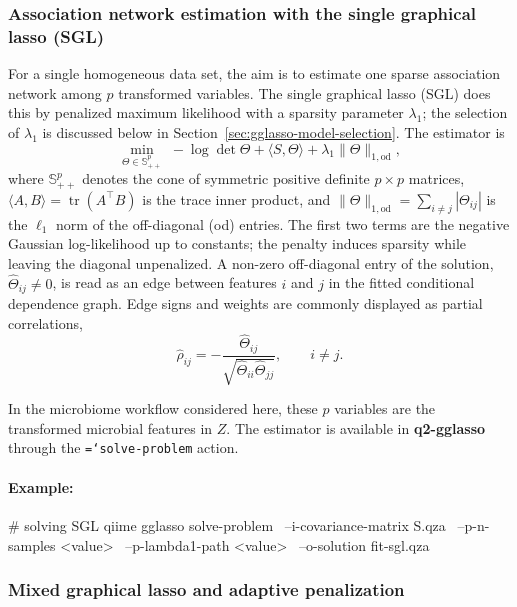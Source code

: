 \documentclass[11pt,a4paper]{article}
\newcommand{\code}[1]{\allowbreak\texttt{\hyphenchar\font=`\-\relax #1}}
\newcommand{\pkg}[1]{\textbf{#1}}
\newcommand{\Sp}{\mathbb{S}}
\newcommand{\Th}{\Theta}
\newcommand{\tr}{\operatorname{tr}}
\newcommand{\odnorm}[1]{\lVert #1 \rVert_{1,\mathrm{od}}}
\begin{document}
\subsubsection{Association network estimation with the single graphical lasso (SGL)}
\label{sec:sgl}

For a single homogeneous data set, the aim is to estimate one sparse association
network among $p$ transformed variables. The single graphical lasso (SGL) does
this by penalized maximum likelihood with a sparsity parameter $\lambda_1$; the
selection of $\lambda_1$ is discussed below in
Section~\ref{sec:gglasso-model-selection}. The estimator is
\begin{equation}
\label{eq:sgl}
\min_{\Th \in \Sp^{p}_{++}} \;
-\log\det \Th + \langle S, \Th \rangle + \lambda_{1} \odnorm{\Th},
\end{equation}
where $\Sp^{p}_{++}$ denotes the cone of symmetric positive definite $p \times p$
matrices, $\langle A,B\rangle = \tr(A^{\top}B)$ is the trace inner product, and
$\odnorm{\Th} = \sum_{i \neq j} |\Th_{ij}|$ is the $\ell_1$ norm of the
off-diagonal (od) entries. The first two terms are the negative Gaussian
log-likelihood up to constants; the penalty induces sparsity while leaving the
diagonal unpenalized. A non-zero off-diagonal entry of the solution,
$\widehat{\Theta}_{ij}\ne 0$, is read as an edge between features $i$ and $j$ in
the fitted conditional dependence graph. Edge signs and weights are commonly
displayed as partial correlations,
\begin{equation}
\label{eq:partialcor}
\widehat{\rho}_{ij}
= - \frac{\widehat{\Theta}_{ij}}
{\sqrt{\widehat{\Theta}_{ii} \widehat{\Theta}_{jj}}},
\qquad i \neq j .
\end{equation}

In the microbiome workflow considered here, these $p$ variables are the
transformed microbial features in $Z$. The estimator is available in
\pkg{q2-gglasso} through the \code{solve-problem} action.

\paragraph{Example:} \mbox{}
\begin{PseudoCode}
# solving SGL
qiime gglasso solve-problem \
    --i-covariance-matrix S.qza \
    --p-n-samples <value> \
    --p-lambda1-path <value> \
    --o-solution fit-sgl.qza
\end{PseudoCode}

\subsubsection{Mixed graphical lasso and adaptive penalization}
\label{sec:adaptive}
\end{document}
